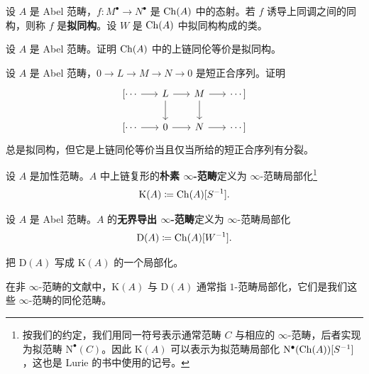 \begin{definition}\label{L17-1.6}
设 $A$ 是 Abel 范畴，$f\colon M^{\bullet}\to N^{\bullet}$ 是 $\operatorname{Ch}(A)$ 中的态射。若 $f$ 诱导上同调之间的同构，则称 $f$ 是\textbf{拟同构}。设 $W$ 是 $\operatorname{Ch}(A)$ 中拟同构构成的类。
\end{definition}

\begin{exercise}\label{L17-1.7}
设 $A$ 是 Abel 范畴。证明 $\operatorname{Ch}(A)$ 中的上链同伦等价是拟同构。
\end{exercise}

\begin{exercise}\label{L17-1.8}
设 $A$ 是 Abel 范畴，$0\to L\to M\to N\to 0$ 是短正合序列。证明
\[
\begin{tikzcd}[row sep=1.6em,column sep=1.7em]
\lbrack\cdots \arrow[r] & L \arrow[r] \arrow[d] & M \arrow[r] \arrow[d] & \cdots\rbrack \\
\lbrack\cdots \arrow[r] & 0 \arrow[r] & N \arrow[r] & \cdots\rbrack
\end{tikzcd}
\]
总是拟同构，但它是上链同伦等价当且仅当所给的短正合序列有分裂。
\end{exercise}

\begin{definition}\label{L17-1.9}
设 $A$ 是加性范畴。$A$ 中上链复形的\textbf{朴素 $\infty$-范畴}定义为 $\infty$-范畴局部化\footnote{按我们的约定，我们用同一符号表示通常范畴 $C$ 与相应的 $\infty$-范畴，后者实现为拟范畴 $\mathrm{N}^{\bullet}(C)$。因此 $\mathrm{K}(A)$ 可以表示为拟范畴局部化 $\mathrm{N}^{\bullet}(\operatorname{Ch}(A))[S^{-1}]$，这也是 Lurie 的书中使用的记号。}
\[
\mathrm{K}(A)\coloneqq\operatorname{Ch}(A)[S^{-1}].
\]
\end{definition}


\begin{definition}\label{L17-1.10}
设 $A$ 是 Abel 范畴。$A$ 的\textbf{无界导出 $\infty$-范畴}定义为 $\infty$-范畴局部化
\[
\mathrm{D}(A)\coloneqq\operatorname{Ch}(A)[W^{-1}].
\]
\end{definition}

\begin{exercise}\label{L17-1.11}
把 $\mathrm{D}(A)$ 写成 $\mathrm{K}(A)$ 的一个局部化。
\end{exercise}

\begin{warning}\label{L17-1.12}
在非 $\infty$-范畴的文献中，$\mathrm{K}(A)$ 与 $\mathrm{D}(A)$ 通常指 $1$-范畴局部化，它们是我们这些 $\infty$-范畴的同伦范畴。
\end{warning}

